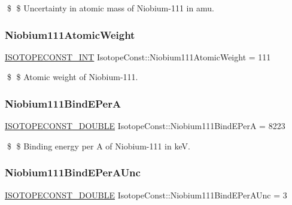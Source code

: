 \$ \$ Uncertainty in atomic mass of Niobium-\/111 in amu. \mbox{\label{group___isotope_const-_niobium-_nb111_ga7bf3c74648b84662164867b5eb6b4eb9}} 
\subsubsection{\texorpdfstring{Niobium111\+Atomic\+Weight}{Niobium111AtomicWeight}}
{\footnotesize\ttfamily \mbox{\hyperlink{group___isotope_const-_macros_ga5f18360b3e99483a35c32d789e62621c}{I\+S\+O\+T\+O\+P\+E\+C\+O\+N\+S\+T\+\_\+\+I\+NT}} Isotope\+Const\+::\+Niobium111\+Atomic\+Weight = 111}

\$ \$ Atomic weight of Niobium-\/111. \mbox{\label{group___isotope_const-_niobium-_nb111_ga139e789a89ebf09b8484641a0c19dfa2}} 
\subsubsection{\texorpdfstring{Niobium111\+Bind\+E\+PerA}{Niobium111BindEPerA}}
{\footnotesize\ttfamily \mbox{\hyperlink{group___isotope_const-_macros_ga8f45a7272ce02c0b4c65c44636ed719a}{I\+S\+O\+T\+O\+P\+E\+C\+O\+N\+S\+T\+\_\+\+D\+O\+U\+B\+LE}} Isotope\+Const\+::\+Niobium111\+Bind\+E\+PerA = 8223}

\$ \$ Binding energy per A of Niobium-\/111 in keV. \mbox{\label{group___isotope_const-_niobium-_nb111_ga868ec834508a702d867e689965cab4d1}} 
\subsubsection{\texorpdfstring{Niobium111\+Bind\+E\+Per\+A\+Unc}{Niobium111BindEPerAUnc}}
{\footnotesize\ttfamily \mbox{\hyperlink{group___isotope_const-_macros_ga8f45a7272ce02c0b4c65c44636ed719a}{I\+S\+O\+T\+O\+P\+E\+C\+O\+N\+S\+T\+\_\+\+D\+O\+U\+B\+LE}} Isotope\+Const\+::\+Niobium111\+Bind\+E\+Per\+A\+Unc = 3}

